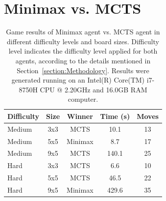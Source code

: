 \documentclass[journal]{IEEEtran}
\begin{document}
\section{Minimax vs. MCTS}
\label{Appendix:resultsMinimaxvsMCTS}
\begin{table}[h!]
    \caption{Game results of Minimax agent vs. MCTS agent in different difficulty levels and board sizes. Difficulty level indicates the difficulty level applied for both agents, according to the details mentioned in Section~\ref{section:Methodology}. Results were generated running on an Intel(R) Core(TM) i7-8750H CPU @ 2.20GHz and 16.0GB RAM computer.}
    \centering
    \label{tab:MinimaxvsMCTS}
        \begin{tabular}{l c c c c}
        \hline
        Difficulty & Size & Winner & Time (s) & Moves\\
        \hline
        Medium & 3x3 & MCTS & 10.1 & 13\\
        Medium & 5x5 & Minimax & 8.7 & 17\\
        Medium & 9x5 & MCTS & 140.1 & 25\\
        \addlinespace
        Hard & 3x3 & MCTS & 6.6 & 10 \\
        Hard & 5x5 & MCTS & 46.5 & 22\\
        Hard & 9x5 & Minimax & 429.6 & 35\\
        \hline
        \end{tabular}
\end{table}

 
\end{document}
